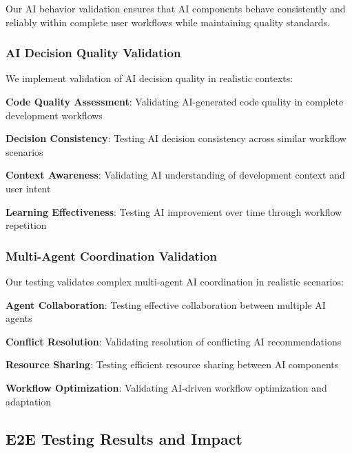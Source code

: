 Our AI behavior validation ensures that AI components behave consistently and reliably within complete user workflows while maintaining quality standards.

\subsubsection*{AI Decision Quality Validation}

We implement validation of AI decision quality in realistic contexts:

\begin{compactlist}
    \item \textbf{Code Quality Assessment}: Validating AI-generated code quality in complete development workflows
    \item \textbf{Decision Consistency}: Testing AI decision consistency across similar workflow scenarios
    \item \textbf{Context Awareness}: Validating AI understanding of development context and user intent
    \item \textbf{Learning Effectiveness}: Testing AI improvement over time through workflow repetition
\end{compactlist}

\subsubsection*{Multi-Agent Coordination Validation}

Our testing validates complex multi-agent AI coordination in realistic scenarios:

\begin{compactlist}
    \item \textbf{Agent Collaboration}: Testing effective collaboration between multiple AI agents
    \item \textbf{Conflict Resolution}: Validating resolution of conflicting AI recommendations
    \item \textbf{Resource Sharing}: Testing efficient resource sharing between AI components
    \item \textbf{Workflow Optimization}: Validating AI-driven workflow optimization and adaptation
\end{compactlist}

\subsection*{E2E Testing Results and Impact}

